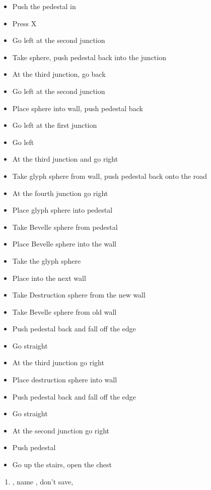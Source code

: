 \begin{trial}
  \begin{itemize}
    \item Push the pedestal in
    \item Press X
    \item Go left at the second junction
    \item Take sphere, push pedestal back into the junction
    \item At the third junction, go back
    \item Go left at the second junction
    \item Place sphere into wall, push pedestal back
    \item Go left at the first junction
    \item Go left
    \item At the third junction and go right
    \item Take glyph sphere from wall, push pedestal back onto the road
    \item At the fourth junction go right
    \item Place glyph sphere into pedestal
    \item Take Bevelle sphere from pedestal
    \item Place Bevelle sphere into the wall
    \item Take the glyph sphere
    \item Place into the next wall
    \item Take Destruction sphere from the new wall %
    \item Take Bevelle sphere from old wall
    \item Push pedestal back and fall off the edge
    \item Go straight
    \item At the third junction go right
    \item Place destruction sphere into wall
    \item Push pedestal back and fall off the edge
    \item Go straight
    \item At the second junction go right
    \item Push pedestal
    \item Go up the stairs, open the chest
  \end{itemize}
\end{trial}
\begin{enumerate}[resume]
  \item \sd, name \bahamut, don't save, \sd
\end{enumerate}

